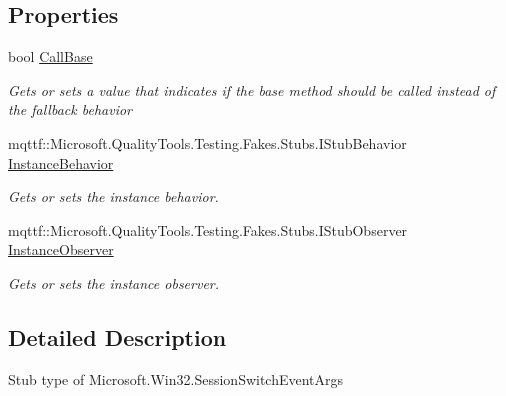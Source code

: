 \subsection*{Properties}
\begin{DoxyCompactItemize}
\item 
bool \hyperlink{class_microsoft_1_1_win32_1_1_fakes_1_1_stub_session_switch_event_args_af662a84e4b573a747f0f84646273725a}{Call\-Base}
\begin{DoxyCompactList}\small\item\em Gets or sets a value that indicates if the base method should be called instead of the fallback behavior\end{DoxyCompactList}\item 
mqttf\-::\-Microsoft.\-Quality\-Tools.\-Testing.\-Fakes.\-Stubs.\-I\-Stub\-Behavior \hyperlink{class_microsoft_1_1_win32_1_1_fakes_1_1_stub_session_switch_event_args_a93690defc52ca82606dc20e822b3205f}{Instance\-Behavior}
\begin{DoxyCompactList}\small\item\em Gets or sets the instance behavior.\end{DoxyCompactList}\item 
mqttf\-::\-Microsoft.\-Quality\-Tools.\-Testing.\-Fakes.\-Stubs.\-I\-Stub\-Observer \hyperlink{class_microsoft_1_1_win32_1_1_fakes_1_1_stub_session_switch_event_args_a186e81f4e592ddfbd0f62863e44029c0}{Instance\-Observer}
\begin{DoxyCompactList}\small\item\em Gets or sets the instance observer.\end{DoxyCompactList}\end{DoxyCompactItemize}


\subsection{Detailed Description}
Stub type of Microsoft.\-Win32.\-Session\-Switch\-Event\-Args



